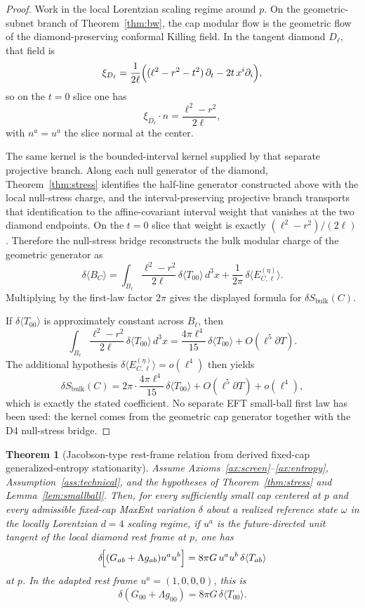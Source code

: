 \documentclass[11pt]{article}
\newtheorem{theorem}{Theorem}[section]
\begin{document}
\begin{proof}
Work in the local Lorentzian scaling regime around $p$. On the geometric-subnet branch of Theorem~\ref{thm:bw}, the cap modular flow is the geometric flow of the diamond-preserving conformal Killing field. In the tangent diamond $D_\ell$, that field is
\[
\xi_{D_\ell}
=
\frac{1}{2\ell}
\Bigl((\ell^2-r^2-t^2)\,\partial_t-2t\,x^i\partial_i\Bigr),
\]
so on the $t=0$ slice one has
\[
\xi_{D_\ell}\!\cdot n=\frac{\ell^2-r^2}{2\ell},
\]
with $n^a=u^a$ the slice normal at the center.

The same kernel is the bounded-interval kernel supplied by that separate projective branch. Along each null generator of the diamond, Theorem~\ref{thm:stress} identifies the half-line generator constructed above with the local null-stress charge, and the interval-preserving projective branch transports that identification to the affine-covariant interval weight that vanishes at the two diamond endpoints. On the $t=0$ slice that weight is exactly $(\ell^2-r^2)/(2\ell)$. Therefore the null-stress bridge reconstructs the bulk modular charge of the geometric generator as
\[
\delta\langle B_C\rangle
=
\int_{B_\ell}\frac{\ell^2-r^2}{2\ell}\,\delta\langle T_{00}\rangle\,d^3x
+\frac{1}{2\pi}\,\delta\langle E^{(\eta)}_{C,\ell}\rangle.
\]
Multiplying by the first-law factor $2\pi$ gives the displayed formula for $\delta S_{\mathrm{bulk}}(C)$.

If $\delta\langle T_{00}\rangle$ is approximately constant across $B_\ell$, then
\[
\int_{B_\ell}\frac{\ell^2-r^2}{2\ell}\,\delta\langle T_{00}\rangle\,d^3x
=
\frac{4\pi\ell^4}{15}\,\delta\langle T_{00}\rangle
+O(\ell^5\partial T).
\]
\noindent
The additional hypothesis $\delta\langle E^{(\eta)}_{C,\ell}\rangle=o(\ell^4)$ then yields
\[
\delta S_{\mathrm{bulk}}(C)
=
2\pi\cdot\frac{4\pi\ell^4}{15}\,\delta\langle T_{00}\rangle
+O(\ell^5\partial T)+o(\ell^4),
\]
which is exactly the stated coefficient. No separate EFT small-ball first law has been used: the kernel comes from the geometric cap generator together with the D4 null-stress bridge.
\end{proof}

\begin{theorem}[Jacobson-type rest-frame relation from derived fixed-cap generalized-entropy stationarity]\label{thm:einstein}
Assume Axioms~\ref{ax:screen}--\ref{ax:entropy}, Assumption~\ref{ass:technical}, and the hypotheses of Theorem~\ref{thm:stress} and Lemma~\ref{lem:smallball}. Then, for every sufficiently small cap centered at $p$ and every admissible fixed-cap MaxEnt variation $\delta$ about a realized reference state $\omega$ in the locally Lorentzian $d=4$ scaling regime, if $u^a$ is the future-directed unit tangent of the local diamond rest frame at $p$, one has
\[
\delta\!\Bigl[(G_{ab}+\Lambda g_{ab})u^a u^b\Bigr]
=
8\pi G\,u^a u^b\,\delta\langle T_{ab}\rangle
\]
at $p$. In the adapted rest frame $u^a=(1,0,0,0)$, this is
\[
\delta\!\left(G_{00}+\Lambda g_{00}\right)=8\pi G\,\delta\langle T_{00}\rangle.
\]
\end{theorem}
\end{document}

